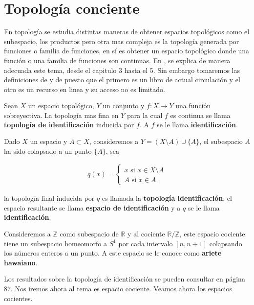 \section*{Topología conciente}

En topología se estudia distintas maneras de obtener espacios topológicos como el subespacio, los productos pero otra mas compleja es la topología generada por funciones o familia de funciones, en sí es obtener un espacio topológico donde una función o una familia de funciones son continuas. En \cite{top_salicrup}, se explica de manera adecuada este tema, desde el capitulo 3 hasta el 5. Sin embargo tomaremos las definiciones de \cite{top_prieto} y de \cite{top_juan} puesto que el primero es un libro de actual circulación y el otro es un recurso en linea y su acceso no es limitado. 

\begin{df}
Sean $X$ un espacio topológico, $Y$ un conjunto y $f:X \to Y$ una función sobreyectiva. La topología mas fina en $Y$ para la cual $f$ es continua se llama \textbf{topología de identificación} inducida por $f$. A $f$ se le llama \textbf{identificación}.
\end{df}

Dado $X$ un espacio y $A \subset X$, consideremos a $Y=(X\setminus A) \cup \{A\}$, el subespacio $A$ ha sido colapsado a un punto $\{A\}$, sea

\begin{align*}
q(x)= \begin{cases}
x \text{ si } x \in X\setminus A \\
A \text{ si } x \in A.
\end{cases}
\end{align*}

la topología final inducida por $q$ es llamada la \textbf{topología identificación}; el espacio resultante se llama \textbf{espacio de identificación} y a $q$ se le llama \textbf{identificación}. 

\begin{ej}
Consideremos a $\mathbb{Z}$ como subespacio de $\mathbb{R}$ y al cociente $\mathbb{R}/\mathbb{Z}$, este espacio cociente tiene un subespacio homeomorfo a $S^1$ por cada intervalo $[n,n+1]$ colapsando los números enteros a un punto. A este espacio se le conoce como \textbf{ariete hawaiano}.
\end{ej}

Los resultados sobre la topología de identificación se pueden consultar en \cite{top_prieto} página 87. Nos iremos ahora al tema es espacio cociente. Veamos ahora los espacios cocientes.

